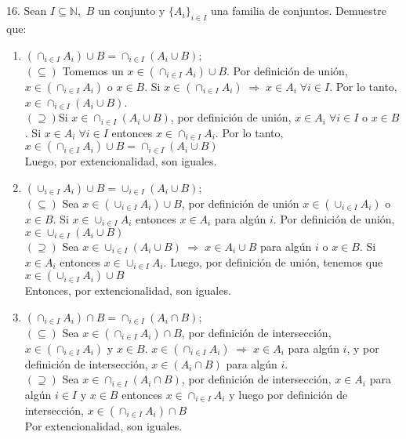 \section{}
16. Sean $I \subseteq \mathbb{N},$ $B$ un conjunto y $\{A_i\}_{i \in I} $ una familia de conjuntos. Demuestre que:
\begin{enumerate}
	\renewcommand{\labelenumi}{({\alph{enumi}})} \item $(\cap _{i \in I} A_i ) \cup B = \cap _{i \in I} (A_i \cup B);$\\
	
	$(\subseteq)$ Tomemos un $x \in (\cap _{i \in I} A_i ) \cup B$. Por definición de unión, $x \in (\cap _{i \in I} A_i )$ o $x \in B$. Si $x \in (\cap _{i \in I} A_i ) \; \Rightarrow \; x\in A_i \; \forall i \in I$. Por lo tanto, $x \in \cap _{i \in I} (A_i \cup B)$.\\
	$(\supseteq)$Si $x \in \cap _{i \in I} (A_i \cup B)$, por definición de unión, $x \in A_i \; \forall i \in I$ o $x \in B$. Si $x\in A_i \; \forall i \in I $ entonces $x \in \cap _{i\in I} A_i$. Por lo tanto, $x \in (\cap _{i \in I} A_i ) \cup B = \cap _{i \in I} (A_i \cup B)$\\
Luego, por extencionalidad, son iguales.
	
	\renewcommand{\labelenumi}{({\alph{enumi}})} \item $(\cup _{i \in I} A_i) \cup B = \cup _{i \in I} (A_i \cup B);$\\
	
	$(\subseteq)$ Sea $x \in (\cup _{i \in I} A_i) \cup B$, por definición de unión $x \in (\cup _{i \in I} A_i)$ o $x \in B$. Si $x \in \cup _{i \in I} A_i$ entonces $x \in A_i$ para algún $i$. Por definición de unión, $x \in \cup _{i \in I} (A_i \cup B)$\\
	$(\supseteq)$ Sea $x \in \cup _{i \in I} (A_i \cup B) \; \Rightarrow \; x\in A_i \cup B$ para algún $i$ o $x \in B$. Si $x \in A_i$ entonces $x \in \cup _{i \in I} A_i$. Luego, por definición de unión, tenemos que $x \in (\cup _{i \in I} A_i) \cup B$\\
	Entonces, por extencionalidad, son iguales.
	\renewcommand{\labelenumi}{({\alph{enumi}})} \item $(\cap _{i \in I} A_i)\cap B = \cap _{i \in I} (A_i \cap B);$\\
	
	$(\subseteq)$ Sea $x \in (\cap _{i \in I} A_i)\cap B$, por definición de intersección, $x \in (\cap _{i \in I} A_i)$ y $x \in B$. $x \in (\cap _{i \in I} A_i) \; \Rightarrow \; x \in A_i$ para algún $i$, y por definición de intersección, $x \in (A_i \cap B)$ para algún $i$.\\
	$(\supseteq)$ Sea $x \in \cap _{i \in I} (A_i \cap B)$, por definición de intersección, $x \in A_i$ para algún $i \in I$ y $x \in B$ entonces $x\in \cap _{i \in I} A_i$ y luego por definición de intersección, $x \in (\cap _{i \in I} A_i)\cap B$\\
	Por extencionalidad, son iguales.
	
\end{enumerate}